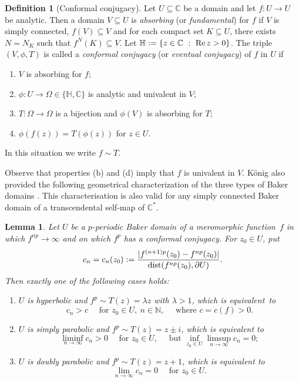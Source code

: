 \documentclass[a4paper, 12pt, reqno]{amsart}
\numberwithin{equation}{section}
\theoremstyle{plain}
\newtheorem{lem}[thm]{Lemma}
\theoremstyle{definition}
\newtheorem{dfn}[thm]{Definition}
\theoremstyle{remark}
\newcommand{\C}{{\mathbb{C}}}
\newcommand{\N}{{\mathbb{N}}}
\begin{document}
\begin{dfn}[Conformal conjugacy]
Let $U\subseteq \C$ be a domain and let \mbox{$f:U\to U$} be analytic. Then a domain $V\subseteq U$ is \textit{absorbing} (or \textit{fundamental}) for $f$ if $V$ is simply connected, $f(V)\subseteq V$ and for each compact set $K\subseteq U$, there exists $N=N_K$ such that $f^N(K)\subseteq V$.
Let $\mathbb H:=\{z\in\C\ :\ \textup{Re}\, z>0\}$. The triple $(V,\phi,T)$ is called a \textit{conformal conjugacy} (or \textit{eventual conjugacy}) of $f$ in $U$ if
\begin{enumerate}
\item[(a)] $V$ is absorbing for $f$;
\item[(b)] $\phi:U\to \Omega\in\{\mathbb H, \C\}$ is analytic and univalent in $V$;
\item[(c)] $T:\Omega\to\Omega$ is a bijection and $\phi(V)$ is absorbing for $T$;
\item[(d)] $\phi(f(z))=T(\phi(z))$ for $z\in U$.
\end{enumerate}
In this situation we write $f\sim T$.
\end{dfn}

Observe that properties (b) and (d) imply that $f$ is univalent in $V$. K\"onig also provided the following geometrical characterization of the three types of Baker domains \cite[Theorem~3]{koenig99}. This characterisation is also valid for any simply connected Baker domain of a transcendental self-map of $\C^*$.%

\begin{lem}
Let $U$ be a $p$-periodic Baker domain of a meromorphic function~$f$ in which $f^{np}\to\infty$ and on which $f^p$ has a conformal conjugacy. For $z_0\in U$, put
$$
c_n=c_n(z_0):=\frac{|f^{(n+1)p}(z_0)-f^{np}(z_0)|}{\textup{dist}(f^{np}(z_0),\partial U)}.
$$
Then exactly one of the following cases holds:
\begin{enumerate}
\item[(a)] $U$ is hyperbolic and $f^p\sim T(z)=\lambda z$ with $\lambda>1$, which is \mbox{equivalent~to}
$$
c_n>c\quad \mbox{ for } z_0\in U,\ n\in \N,\quad \mbox{ where } c=c(f)>0.
$$
\item[(b)] $U$ is simply parabolic and $f^p\sim T(z)=z\pm i$, which is equivalent to 
$$
\liminf_{n\to\infty} c_n>0 \quad \mbox{ for } z_0\in U,\quad \mbox{ but } \inf_{z_0\in U}\limsup_{n\to\infty} c_n=0;
$$
\item[(c)] $U$ is doubly parabolic and $f^p\sim T(z)=z+1$, which is equivalent to
$$
\lim_{n\to\infty} c_n=0\quad \mbox{ for } z_0\in U.
$$
\end{enumerate}
\label{lem:bd-koenig}
\end{lem}
\end{document}

